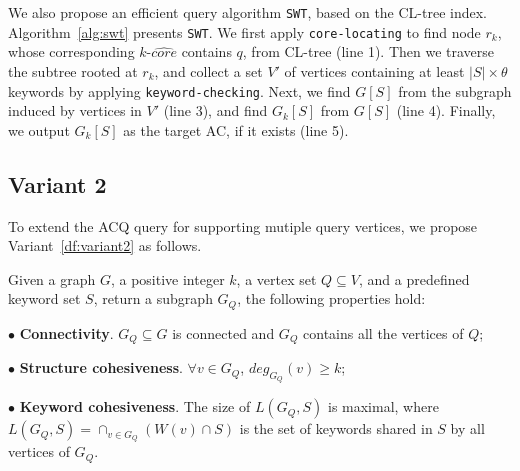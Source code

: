 {We also propose an efficient query algorithm {\tt SWT}, based on the CL-tree index.
Algorithm~\ref{alg:swt} presents {\tt SWT}. We first apply {\tt core-locating} to find node $r_k$, whose corresponding $k$-$\widehat {core}$ contains $q$, from CL-tree (line 1).
Then we traverse the subtree rooted at $r_k$, and collect a set $V'$ of vertices containing at least $|S|\times \theta$ keywords by applying {\tt keyword-checking}.
Next, we find $G[S]$ from the subgraph induced by vertices in $V'$ (line 3),
and find $G_k[S]$ from $G[S]$ (line 4).
Finally, we output $G_k[S]$ as the target AC, if it exists (line 5).



\subsection{Variant 2}

To extend the ACQ query for supporting mutiple query vertices, we propose Variant~\ref{df:variant2} as follows.

\begin{variant}
\label{df:variant2}
Given a graph $G$, a positive integer $k$, a vertex set $Q$$\subseteq$$V$, and a predefined keyword set $S$, return a subgraph $G_Q$, the following properties hold:

$\bullet$ \textbf{Connectivity}. $G_Q \subseteq G$ is connected and $G_Q$ contains all the vertices of $Q$;

$\bullet$ \textbf{Structure cohesiveness}. $\forall$$v\in G_Q$, $deg_{G_Q}(v)\geq$$k$;

$\bullet$ \textbf{Keyword cohesiveness}. The size of $L(G_Q, S)$ is maximal, where $L(G_Q, S)=\cap_{v \in G_Q}(W(v)\cap S)$ is the set of keywords shared in $S$ by all vertices of $G_Q$.
\end{variant}

}
